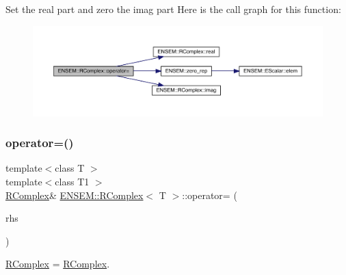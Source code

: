 Set the real part and zero the imag part Here is the call graph for this function\+:
\nopagebreak
\begin{figure}[H]
\begin{center}
\leavevmode
\includegraphics[width=350pt]{d9/d0e/classENSEM_1_1RComplex_a6553ee6381e82a410c0c531fde8e3fee_cgraph}
\end{center}
\end{figure}
\mbox{\label{classENSEM_1_1RComplex_a14a5d3857ebb326ed5f211cc30da3ced}} 
\subsubsection{\texorpdfstring{operator=()}{operator=()}\hspace{0.1cm}{\footnotesize\ttfamily [4/6]}}
{\footnotesize\ttfamily template$<$class T $>$ \\
template$<$class T1 $>$ \\
\mbox{\hyperlink{classENSEM_1_1RComplex}{R\+Complex}}\& \mbox{\hyperlink{classENSEM_1_1RComplex}{E\+N\+S\+E\+M\+::\+R\+Complex}}$<$ T $>$\+::operator= (\begin{DoxyParamCaption}\item[{const \mbox{\hyperlink{classENSEM_1_1RComplex}{R\+Complex}}$<$ T1 $>$ \&}]{rhs }\end{DoxyParamCaption})\hspace{0.3cm}{\ttfamily [inline]}}



\mbox{\hyperlink{classENSEM_1_1RComplex}{R\+Complex}} = \mbox{\hyperlink{classENSEM_1_1RComplex}{R\+Complex}}. 

